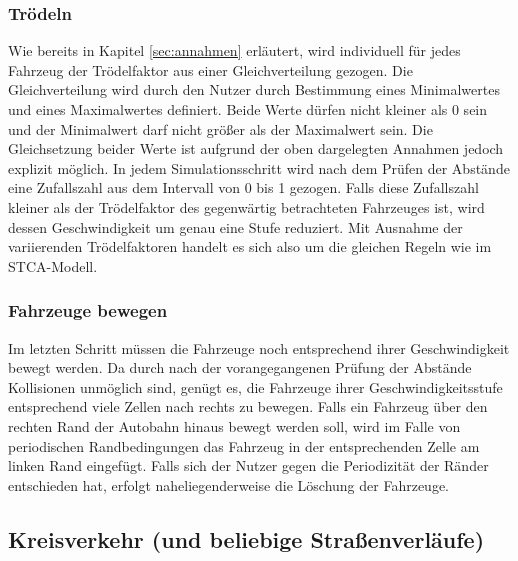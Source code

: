 \documentclass[11pt, a4paper]{article}
\begin{document}
\subsubsection{Trödeln}
\label{subsubsec:troedeln}

Wie bereits in Kapitel \ref{sec:annahmen} erläutert, wird individuell für jedes Fahrzeug der Trödelfaktor aus einer Gleichverteilung gezogen. Die Gleichverteilung wird durch den Nutzer durch Bestimmung eines Minimalwertes und eines Maximalwertes definiert. Beide Werte dürfen nicht kleiner als 0 sein und der Minimalwert darf nicht größer als der Maximalwert sein. Die Gleichsetzung beider Werte ist aufgrund der oben dargelegten Annahmen jedoch explizit möglich. In jedem Simulationsschritt wird nach dem Prüfen der Abstände eine Zufallszahl aus dem Intervall von 0 bis 1 gezogen. Falls diese Zufallszahl kleiner als der Trödelfaktor des gegenwärtig betrachteten Fahrzeuges ist, wird dessen Geschwindigkeit um genau eine Stufe reduziert. Mit Ausnahme der variierenden Trödelfaktoren handelt es sich also um die gleichen Regeln wie im STCA-Modell.

\subsubsection{Fahrzeuge bewegen}
\label{subsubsec:fahrzeugeBewegen}

Im letzten Schritt müssen die Fahrzeuge noch entsprechend ihrer Geschwindigkeit bewegt werden. Da durch nach der vorangegangenen Prüfung der Abstände Kollisionen unmöglich sind, genügt es, die Fahrzeuge ihrer Geschwindigkeitsstufe entsprechend viele Zellen nach rechts zu bewegen. Falls ein Fahrzeug über den rechten Rand der Autobahn hinaus bewegt werden soll, wird im Falle von periodischen Randbedingungen das Fahrzeug in der entsprechenden Zelle am linken Rand eingefügt. Falls sich der Nutzer gegen die Periodizität der Ränder entschieden hat, erfolgt naheliegenderweise die Löschung der Fahrzeuge. 

\newpage

\subsection{Kreisverkehr (und beliebige Straßenverläufe)}
\label{subsec:umsetzung-kreisverkehr}
\end{document}
